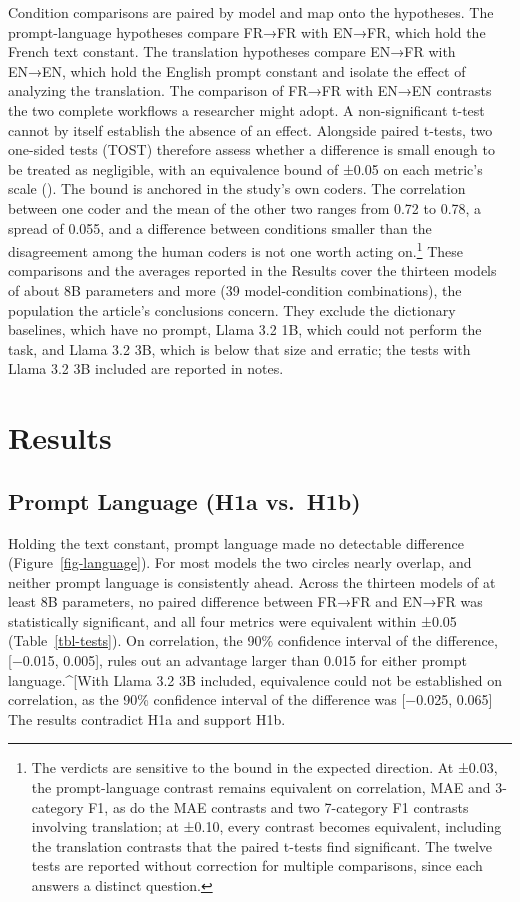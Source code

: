 \documentclass[
  man,
  floatsintext,
  longtable,
  nolmodern,
  notxfonts,
  notimes,
  colorlinks=true,linkcolor=blue,citecolor=blue,urlcolor=blue]{apa7}
\begin{document}
Condition comparisons are paired by model and map onto the hypotheses.
The prompt-language hypotheses compare FR→FR with EN→FR, which hold the
French text constant. The translation hypotheses compare EN→FR with
EN→EN, which hold the English prompt constant and isolate the effect of
analyzing the translation. The comparison of FR→FR with EN→EN contrasts
the two complete workflows a researcher might adopt. A non-significant
t-test cannot by itself establish the absence of an effect. Alongside
paired t-tests, two one-sided tests (TOST) therefore assess whether a
difference is small enough to be treated as negligible, with an
equivalence bound of ±0.05 on each metric's scale
(). The
bound is anchored in the study's own coders. The correlation between one
coder and the mean of the other two ranges from 0.72 to 0.78, a spread
of 0.055, and a difference between conditions smaller than the
disagreement among the human coders is not one worth acting
on.\footnote{The verdicts are sensitive to the bound in the expected
  direction. At ±0.03, the prompt-language contrast remains equivalent
  on correlation, MAE and 3-category F1, as do the MAE contrasts and two
  7-category F1 contrasts involving translation; at ±0.10, every
  contrast becomes equivalent, including the translation contrasts that
  the paired t-tests find significant. The twelve tests are reported
  without correction for multiple comparisons, since each answers a
  distinct question.} These comparisons and the averages reported in the
Results cover the thirteen models of about 8B parameters and more (39
model-condition combinations), the population the article's conclusions
concern. They exclude the dictionary baselines, which have no prompt,
Llama 3.2 1B, which could not perform the task, and Llama 3.2 3B, which
is below that size and erratic; the tests with Llama 3.2 3B included are
reported in notes.

\section{Results}\label{results}

\subsection{Prompt Language (H1a
vs.~H1b)}\label{prompt-language-h1a-vs.-h1b}

Holding the text constant, prompt language made no detectable difference
(Figure~\ref{fig-language}). For most models the two circles nearly
overlap, and neither prompt language is consistently ahead. Across the
thirteen models of at least 8B parameters, no paired difference between
FR→FR and EN→FR was statistically significant, and all four metrics were
equivalent within ±0.05 (Table~\ref{tbl-tests}). On correlation, the
90\% confidence interval of the difference, {[}−0.015, 0.005{]}, rules
out an advantage larger than 0.015 for either prompt
language.\^{}{[}With Llama 3.2 3B included, equivalence could not be
established on correlation, as the 90\% confidence interval of the
difference was {[}−0.025, 0.065{]} The results contradict H1a and
support H1b.
\end{document}
